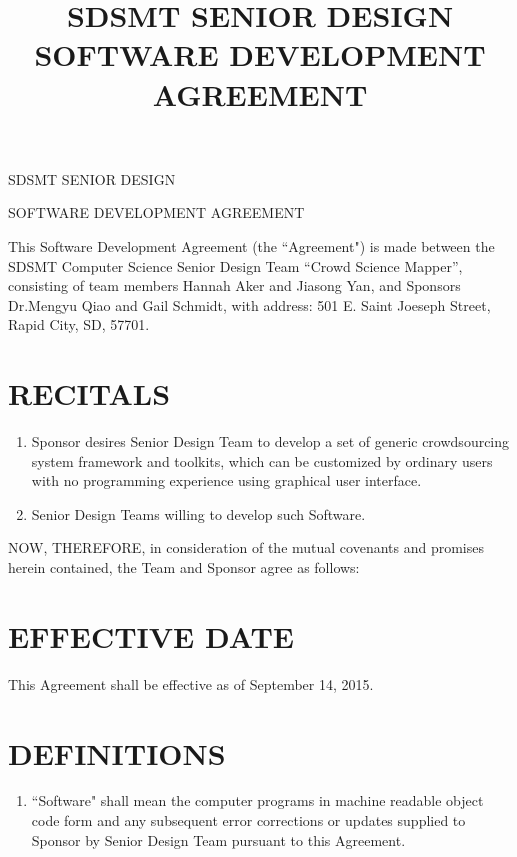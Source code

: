 \documentclass[11pt]{article}
\title{SDSMT SENIOR DESIGN SOFTWARE DEVELOPMENT AGREEMENT}
\begin{document}


{\Large \bf 
\centerline{SDSMT SENIOR DESIGN}\centerline{SOFTWARE DEVELOPMENT AGREEMENT}
}
\vspace{\baselineskip}

This Software Development Agreement (the ``Agreement") is made between the SDSMT  Computer Science Senior Design Team ``Crowd Science Mapper'',
consisting of team members Hannah Aker and Jiasong Yan, 
 and  Sponsors  Dr.Mengyu Qiao and Gail Schmidt, 
 with address: 501 E. Saint Joeseph Street, Rapid City, SD, 57701. 

\section{RECITALS}
\begin{enumerate}  \itemsep4pt \parskip0pt 
\item Sponsor desires Senior Design Team to develop a set of generic crowdsourcing system framework and toolkits, which can be customized by ordinary users with no programming experience using graphical user interface.    

\item Senior Design Teams willing to develop such Software.  
\end{enumerate}
NOW, THEREFORE, in consideration of the mutual covenants and promises herein contained, the Team and Sponsor agree as follows:  

\section{EFFECTIVE DATE }

This Agreement shall be effective as of September 14, 2015.  

\section{DEFINITIONS }
\begin{enumerate}  \itemsep4pt \parskip0pt 
\item ``Software" shall mean the computer programs in machine readable object code form and any subsequent error corrections or updates supplied to Sponsor by Senior Design Team pursuant to this Agreement.

\end{enumerate}
\end{document}

